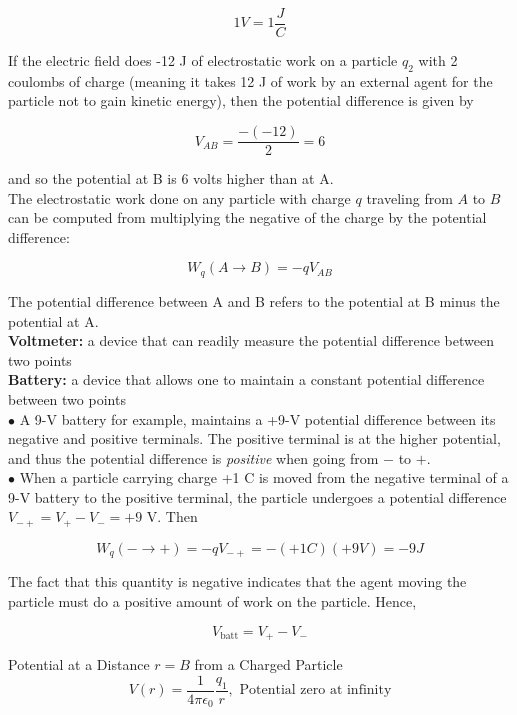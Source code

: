         \[
            1 V = 1 \frac{J}{C}
        \]

        \textit{} If the electric field does -12 J of electrostatic work on a particle $q_2$ with 2 coulombs of charge (meaning it takes 12 J of work by an external agent for the particle not to gain
        kinetic energy), then the potential difference is given by

        \[
            V_{AB} = \frac{-(-12)}{2} = 6
        \]

        and so the potential at B is 6 volts higher than at A. \\

        The electrostatic work done on any particle with charge $q$ traveling from $A$ to $B$ can be computed from multiplying the negative of the charge by the potential difference:

        \[
            W_q (A\to B) = -q V_{AB}
        \]

        The potential difference between A and B refers to the potential at B minus the potential at A. \\

        \textbf{Voltmeter:} a device that can readily measure the potential difference between two points \\
        \textbf{Battery:} a device that allows one to maintain a constant potential difference between two points \\
        $\bullet$ A 9-V battery for example, maintains a +9-V potential difference between its negative and positive terminals. The positive terminal is at the higher potential, and thus the potential difference is
        \textit{positive} when going from $-$ to $+$. \\
        $\bullet$ When a particle carrying charge +1 C is moved from the negative terminal of a 9-V battery to the positive terminal, the particle undergoes a potential difference $V_{-+}=V_{+}-V_{-} = +9$ V. Then

        \[
            W_q (-\to +) = -q V_{-+} = -(+1C)(+9V) = -9 J
        \]

        The fact that this quantity is negative indicates that the agent moving the particle must do a positive amount of work on the particle. Hence,

        \[
            V_{\text{batt}} = V_{+} - V_{-}
        \]

        \begin{theorem}{Potential at a Distance $r=B$ from a Charged Particle}
            \[
                V(r) = \frac{1}{4\pi\epsilon_0}\frac{q_1}{r}, \text{ Potential zero at infinity}
            \]
        \end{theorem}

